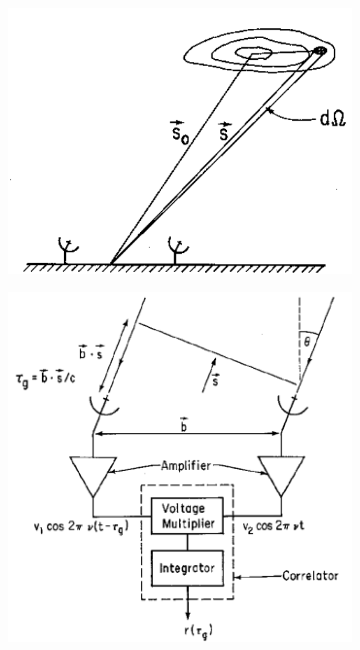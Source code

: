 \documentclass[a4paper,10pt]{report}
\begin{document}
\begin{figure}[ht]
 \begin{mdframed}
 \centering
 \begin{subfigure}[b]{0.3\textwidth}
 \includegraphics[width=\textwidth]{images/phase_center.png}
 \caption{}
 \end{subfigure}
 \begin{subfigure}[b]{0.4\textwidth}
 \includegraphics[width=\textwidth]{images/cosine_correlator.png}

\end{subfigure}
\end{mdframed}
\end{figure}
\end{document}
